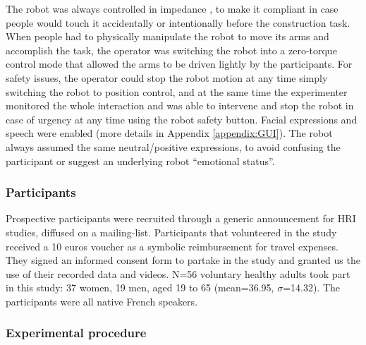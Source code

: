 The robot was always controlled in impedance \cite{idyn2012}, to make it compliant in case people would touch it accidentally or intentionally before the construction task. 
When people had to physically manipulate the robot to move its arms and accomplish the task, the operator was switching the robot into a zero-torque control mode that allowed the arms to be driven lightly by the participants. 
For safety issues, the operator could stop the robot motion at any time simply switching the robot to position control, and at the same time the experimenter monitored the whole interaction 
and was able to intervene and stop the robot in case of urgency at any time using the robot safety button. 
Facial expressions and speech were enabled (more details in Appendix \ref{appendix:GUI}).
The robot always assumed the same neutral/positive expressions, to avoid confusing the participant or suggest an underlying 
robot ``emotional status''.




\subsubsection{Participants} %

Prospective participants were recruited through a generic announcement for HRI studies, diffused on a mailing-list. 
Participants that volunteered in the study received a 10 euros voucher as a symbolic reimbursement for travel expenses. They signed an informed consent form to partake in the study and granted us the use of their recorded data and videos.
N=56 voluntary healthy adults took part in this study: 37 women, 19 men, aged 19 to 65 (mean=36.95, $\sigma$=14.32). The participants were all native French speakers.



\subsubsection{Experimental procedure}\label{section:protocol}


